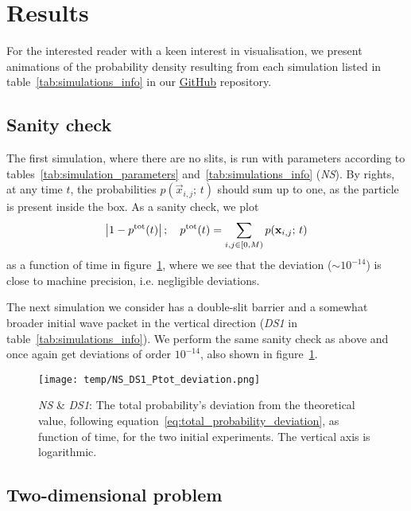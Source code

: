 \section{Results}\label{sec:results}

For the interested reader with a keen interest in visualisation, we present animations of the probability density resulting from each simulation listed in table~\ref{tab:simulations_info} in our \href{\animlink}{GitHub} repository. 



\subsection{Sanity check}\label{sec:results:sanity}

    The first simulation, where there are no slits, is run with parameters according to tables~\ref{tab:simulation_parameters} and~\ref{tab:simulations_info} (\textit{NS}). By rights, at any time $t$, the probabilities $p(\vec{x}_{i,j}; \, t)$ should sum up to one, as the particle is present inside the box. As a sanity check, we plot 
    \begin{equation}\label{eq:total_probability_deviation}
        \abs{1- p^\mathrm{tot}(t)}\,; \quad p^\mathrm{tot}(t) = \sum_{i,j\in [0, M)} p(\mathbf{x}_{i,j};\, t)
    \end{equation}
    as a function of time in figure~\ref{fig:ptot_deviation_NS_DS1}, where we see that the deviation ($\sim 10^{-14}$) is close to machine precision, i.e. negligible deviations.

    The next simulation we consider has a double-slit barrier and a somewhat broader initial wave packet in the vertical direction (\textit{DS1} in table~\ref{tab:simulations_info}). We perform the same sanity check as above and once again get deviations of order $ 10^{-14}$, also shown in figure~\ref{fig:ptot_deviation_NS_DS1}.

    \begin{figure}[ht!]
        \centering
        \texttt{[image: temp/NS\_DS1\_Ptot\_deviation.png]}
        \caption{\textit{NS} \& \textit{DS1}: The total probability's deviation from the theoretical value, following equation~\eqref{eq:total_probability_deviation}, as function of time, for the two initial experiments. The vertical axis is logarithmic.}
        \label{fig:ptot_deviation_NS_DS1}
    \end{figure}


\subsection{Two-dimensional problem}
    
